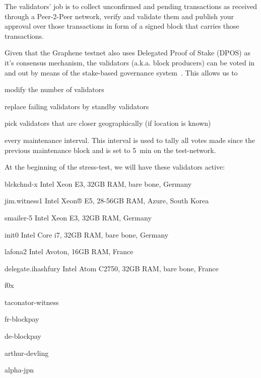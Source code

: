 The validators' job is to collect unconfirmed and pending transactions as
received through a Peer-2-Peer network, verify and validate them and publish
your approval over those transactions in form of a signed block that carries
those transactions.

Given that the Graphene testnet also uses Delegated Proof of Stake (DPOS) as
it's consensus mechanism, the validators (a.k.a. block producers) can be voted
in and out by means of the stake-based governance system~\cite{bts:general}.
This allows us to 
\begin{inparaenum}
 \item modify the number of validators
 \item replace failing validators by standby validators
 \item pick validators that are closer geographically (if location is known)
\end{inparaenum}
every maintenance interval. This interval is used to tally all votes made
since the previous maintenance block and is set to \SI{5}{min} on the
test-network.

At the beginning of the stress-test, we will have these validators active:

\begin{compactdesc}
 \item[blckchnd-x] Intel Xeon E3, 32GB RAM, bare bone, Germany
 \item[jim.witness1] Intel Xeon® E5, 28-56GB RAM, Azure, South Korea
 \item[smailer-5]  Intel Xeon E3, 32GB RAM, Germany
 \item[init0] Intel Core i7, 32GB RAM, bare bone, Germany
 \item[lafona2] Intel Avoton, 16GB RAM, France
 \item[delegate.ihashfury] Intel Atom C2750, 32GB RAM, bare bone, France
 \item[f0x] 
 \item[taconator-witness] 
 \item[fr-blockpay] 
 \item[de-blockpay] 
 \item[arthur-devling] 
 \item[alpha-jpn] 
\end{compactdesc}
